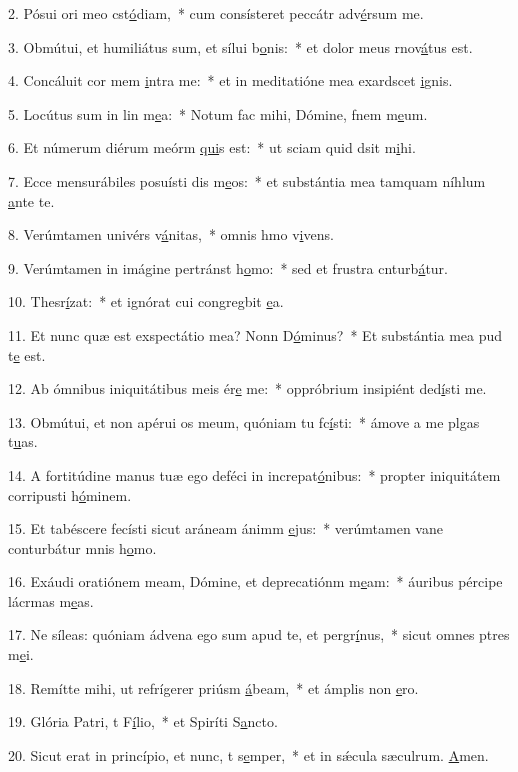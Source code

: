 2. Pósui ori meo cst\uline{ó}diam,~* cum consísteret peccátr adv\uline{é}rsum me.\par 
3. Obmútui, et humiliátus sum, et sílui  b\uline{o}nis:~* et dolor meus rnov\uline{á}tus est.\par 
4. Concáluit cor mem \uline{i}ntra me:~* et in meditatióne mea exardscet \uline{i}gnis.\par 
5. Locútus sum in lin m\uline{e}a:~* Notum fac mihi, Dómine, fnem m\uline{e}um.\par 
6. Et númerum diérum meórm \uline{qui}s est:~* ut sciam quid dsit m\uline{i}hi.\par 
7. Ecce mensurábiles posuísti dis m\uline{e}os:~* et substántia mea tamquam níhlum \uline{a}nte te.\par 
8. Verúmtamen univérs v\uline{á}nitas,~* omnis hmo v\uline{i}vens.\par 
9. Verúmtamen in imágine pertránst h\uline{o}mo:~* sed et frustra cnturb\uline{á}tur.\par 
10. Thesr\uline{í}zat:~* et ignórat cui congregbit \uline{e}a.\par 
11. Et nunc quæ est exspectátio mea? Nonn D\uline{ó}minus?~* Et substántia mea pud t\uline{e} est.\par 
12. Ab ómnibus iniquitátibus meis ér\uline{e} me:~* oppróbrium insipiént ded\uline{í}sti me.\par 
13. Obmútui, et non apérui os meum, quóniam tu fc\uline{í}sti:~* ámove a me plgas t\uline{u}as.\par 
14. A fortitúdine manus tuæ ego deféci in increpat\uline{ó}nibus:~* propter iniquitátem corripusti h\uline{ó}minem.\par 
15. Et tabéscere fecísti sicut aráneam ánimm \uline{e}jus:~* verúmtamen vane conturbátur mnis h\uline{o}mo.\par 
16. Exáudi oratiónem meam, Dómine, et deprecatiónm m\uline{e}am:~* áuribus pércipe lácrmas m\uline{e}as.\par 
17. Ne síleas: quóniam ádvena ego sum apud te, et pergr\uline{í}nus,~* sicut omnes ptres m\uline{e}i.\par 
18. Remítte mihi, ut refrígerer priúsm \uline{á}beam,~* et ámplis non \uline{e}ro.\par 
19. Glória Patri, t F\uline{í}lio,~* et Spiríti S\uline{a}ncto.\par 
20. Sicut erat in princípio, et nunc, t s\uline{e}mper,~* et in sǽcula sæculrum. \uline{A}men.\par 
